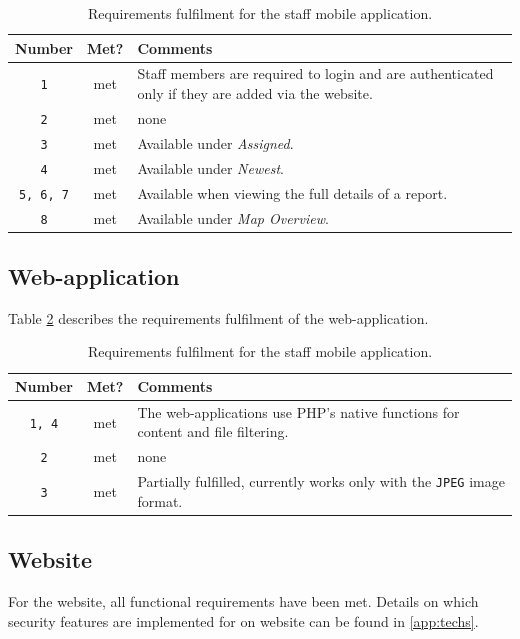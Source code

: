\documentclass[12pt]{ecsproject}     %
\begin{document}
\begin{table}
\begin{tabular}{ c | c | p{10cm}}
\textbf{Number} & \textbf{Met?} & \textbf{Comments} \\
\hline
\texttt{1} & met & Staff members are required to login and are authenticated only if they are added via the website. \\
\texttt{2} & met & none \\
\texttt{3} & met & Available under \textit{Assigned}.\\
\texttt{4} & met & Available under \textit{Newest}. \\
\texttt{5, 6, 7} & met & Available when viewing the full details of a report.\\
\texttt{8} & met & Available under \textit{Map Overview}.\\
\end{tabular}
\caption{Requirements fulfilment for the staff mobile application.}
\label{tab:srf}
\end{table}

\subsection{Web-application}
Table \ref{tab:warf} describes the requirements fulfilment of the web-application. 

\begin{table}
\begin{tabular}{ c | c | p{10cm}}
\textbf{Number} & \textbf{Met?} & \textbf{Comments} \\
\hline
\texttt{1, 4} & met & The web-applications use PHP's native functions for content and file filtering. \\
\texttt{2} & met & none \\
\texttt{3} & met & Partially fulfilled, currently works only with the \texttt{JPEG} image format.\\
\end{tabular}
\caption{Requirements fulfilment for the staff mobile application.}
\label{tab:warf}
\end{table}


\subsection{Website}
For the website, all functional requirements have been met. Details on which security features are implemented for on website can be found in \ref{app:techs}.
\end{document}
